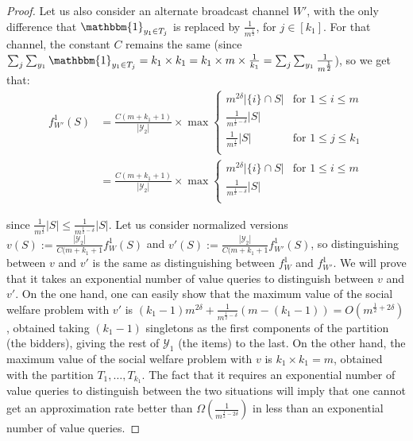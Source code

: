\begin{proof}
  Let us also consider an alternate broadcast channel $W'$, with the only difference that $\mathbbm{1}_{y_1 \in T_j}$ is replaced by $\frac{1}{m^{\frac{1}{2}}}$, for $j \in [k_1]$. For that channel, the constant $C$ remains the same (since $\sum_j\sum_{y_1}\mathbbm{1}_{y_1 \in T_j} = k_1 \times k_1 = k_1 \times m \times \frac{1}{k_1} = \sum_j\sum_{y_1}\frac{1}{m^{\frac{1}{2}}}$), so we get that:
  \begin{equation}
    \begin{aligned}
      f_{W'}^1(S) &= \frac{C(m+k_1+1)}{|\mathcal{Y}_2|} \times \max\begin{cases}
      m^{2\delta}|\{i\} \cap S| & \text{for } 1 \leq i \leq m\\
      \frac{1}{m^{\frac{1}{2}-\delta}}|S|\\
      \frac{1}{m^{\frac{1}{2}}}|S| & \text{for } 1 \leq j \leq k_1\\
      \end{cases}\\
      &= \frac{C(m+k_1+1)}{|\mathcal{Y}_2|} \times \max\begin{cases}
      m^{2\delta}|\{i\} \cap S| & \text{for } 1 \leq i \leq m\\
      \frac{1}{m^{\frac{1}{2}-\delta}}|S|\\
      \end{cases}
    \end{aligned}
  \end{equation}

  since $\frac{1}{m^{\frac{1}{2}}}|S| \leq \frac{1}{m^{\frac{1}{2}-\delta}}|S|$. Let us consider normalized versions $v(S) := \frac{|\mathcal{Y}_2|}{C(m+k_1+1}f_W^1(S)$ and $v'(S) := \frac{|\mathcal{Y}_2|}{C(m+k_1+1}f_{W'}^1(S)$, so distinguishing between $v$ and $v'$ is the same as distinguishing between $f_W^1$ and $f_{W'}^1$. We will prove that it takes an exponential number of value queries to distinguish between $v$ and $v'$. On the one hand, one can easily show that the maximum value of the social welfare problem with $v'$ is $(k_1-1)m^{2\delta}+\frac{1}{m^{\frac{1}{2}-\delta}}(m-(k_1-1)) = O(m^{\frac{1}{2}+2\delta})$, obtained taking $(k_1-1)$ singletons as the first components of the partition (the bidders), giving the rest of $\mathcal{Y}_1$ (the items) to the last. On the other hand, the maximum value of the social welfare problem with $v$ is $k_1 \times k_1 = m$, obtained with the partition $T_1, \ldots, T_{k_1}$. The fact that it requires an exponential number of value queries to distinguish between the two situations will imply that one cannot get an approximation rate better than $\Omega\left(\frac{1}{m^{\frac{1}{2}-2\delta}}\right)$ in less than an exponential number of value queries.


\end{proof}
